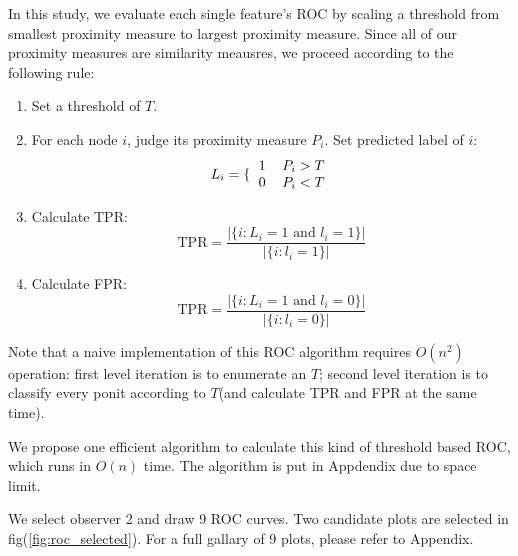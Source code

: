 \documentclass[11pt,a4paper]{article}
\begin{document}
In this study, we evaluate each single feature's ROC by scaling 
a threshold from smallest proximity measure to largest proximity 
measure. Since all of our proximity measures are similarity 
meausres, we proceed according to the following rule:
\begin{enumerate}
	\item Set a threshold of $T$. 
	\item For each node $i$, judge its proximity measure $P_i$. 
	Set predicted label of $i$:
	\begin{equation}
		L_i = \lbrace{
			\begin{tabular}{cc}
				$1$ & $P_i > T$ \\
				$0$ & $P_i < T$ 
			\end{tabular}		
		}
	\end{equation}
	\item Calculate TPR:
	\begin{equation}
		\text{TPR} = \frac{|\{i:L_i=1 \text{ and } l_i=1\}|}{|\{i:l_i=1\}|}
	\end{equation}
	\item Calculate FPR:
	\begin{equation}
		\text{TPR} = \frac{|\{i:L_i=1 \text{ and } l_i=0\}|}{|\{i:l_i=0\}|}
	\end{equation}
\end{enumerate}

Note that a naive implementation of this ROC algorithm requires 
$O(n^2)$ operation: first level iteration is to enumerate an $T$;
second level iteration is to classify every ponit according to 
$T$(and calculate TPR and FPR at the same time).

We propose one efficient algorithm to calculate this kind of 
threshold based ROC, which runs in $O(n)$ time. The algorithm 
is put in Appdendix due to space limit. 

We select observer 2 and draw 9 ROC curves. Two candidate 
plots are selected in fig(\ref{fig:roc_selected}). For a full 
gallary of 9 plots, please refer to Appendix. 
\end{document}

